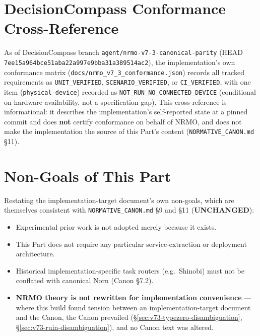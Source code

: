 \section{DecisionCompass Conformance Cross-Reference}
\label{sec:v73-decisioncompass-conformance-summary}

As of DecisionCompass branch \texttt{agent/nrmo-v7-3-canonical-parity}
(HEAD \texttt{7ee15a964bce51aba22a997e9bba31a389514ac2}), the
implementation's own conformance matrix
(\texttt{docs/nrmo\_v7\_3\_conformance.json}) records all tracked
requirements as \texttt{UNIT\_VERIFIED}, \texttt{SCENARIO\_VERIFIED},
or \texttt{CI\_VERIFIED}, with one item
(\texttt{physical-device}) recorded as
\texttt{NOT\_RUN\_NO\_CONNECTED\_DEVICE} (conditional on hardware
availability, not a specification gap). This cross-reference is
informational: it describes the implementation's self-reported state
at a pinned commit and does \textbf{not} certify conformance on behalf
of NRMO, and does not make the implementation the source of this
Part's content (\texttt{NORMATIVE\_CANON.md} \S11).

\section{Non-Goals of This Part}

Restating the implementation-target document's own non-goals, which
are themselves consistent with \texttt{NORMATIVE\_CANON.md} \S9 and
\S11 (\textbf{UNCHANGED}):

\begin{itemize}
\item Experimental prior work is not adopted merely because it exists.
\item This Part does not require any particular service-extraction or
deployment architecture.
\item Historical implementation-specific task routers (e.g.\ Shinobi)
must not be conflated with canonical Norn (Canon \S7.2).
\item \textbf{NRMO theory is not rewritten for implementation
convenience} --- where this build found tension between an
implementation-target document and the Canon, the Canon prevailed
(\S\ref{sec:v73-typezero-disambiguation},
\S\ref{sec:v73-ruin-disambiguation}), and no Canon text was altered.
\end{itemize}
